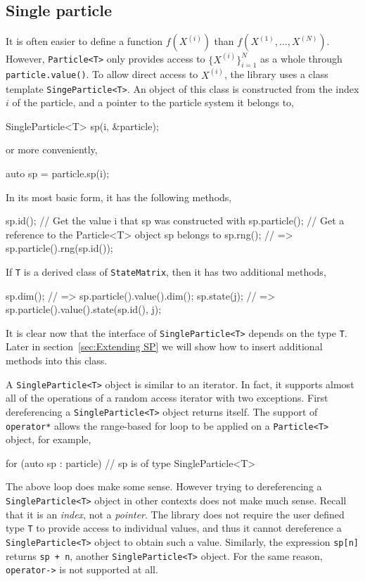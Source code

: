 \subsection{Single particle}
\label{sub:Single particle}

It is often easier to define a function $f(X^{(i)})$ than
$f(X^{(1)},\dots,X^{(N)})$. However, \verb|Particle<T>| only provides access to
$\{X^{(i)}\}_{i=1}^N$ as a whole through \verb|particle.value()|. To allow
direct access to $X^{(i)}$, the library uses a class template
\verb|SingeParticle<T>|. An object of this class is constructed from the index
$i$ of the particle, and a pointer to the particle system it belongs to,
\begin{cppcode}
  SingleParticle<T> sp(i, &particle);
\end{cppcode}
or more conveniently,
\begin{cppcode}
  auto sp = particle.sp(i);
\end{cppcode}
In its most basic form, it has the following methods,
\begin{cppcode}
  sp.id();       // Get the value i that sp was constructed with
  sp.particle(); // Get a reference to the Particle<T> object sp belongs to
  sp.rng();      // => sp.particle().rng(sp.id());
\end{cppcode}
If \verb|T| is a derived class of \verb|StateMatrix|, then it has two
additional methods,
\begin{cppcode}
  sp.dim();    // => sp.particle().value().dim();
  sp.state(j); // => sp.particle().value().state(sp.id(), j);
\end{cppcode}
It is clear now that the interface of \verb|SingleParticle<T>| depends on the
type \verb|T|. Later in section~\ref{sec:Extending SP} we will show how to
insert additional methods into this class.

A \verb|SingleParticle<T>| object is similar to an iterator. In fact, it
supports almost all of the operations of a random access iterator with two
exceptions. First dereferencing a \verb|SingleParticle<T>| object returns
itself. The support of \verb|operator*| allows the range-based for loop to be
applied on a \verb|Particle<T>| object, for example,
\begin{cppcode}
  for (auto sp : particle) {
      // sp is of type SingleParticle<T>
  }
\end{cppcode}
The above loop does make some sense. However trying to dereferencing a
\verb|SingleParticle<T>| object in other contexts does not make much sense.
Recall that it is an \emph{index}, not a \emph{pointer}. The library does not
require the user defined type \verb|T| to provide access to individual values,
and thus it cannot dereference a \verb|SingleParticle<T>| object to obtain such
a value. Similarly, the expression \verb|sp[n]| returns \verb|sp + n|, another
\verb|SingleParticle<T>| object. For the same reason, \verb|operator->| is not
supported at all.


